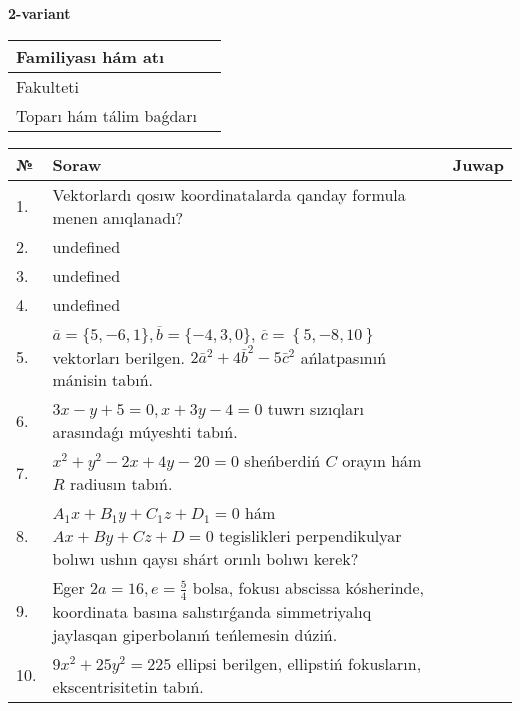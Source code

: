 \documentclass{article}
\begin{document}
\egroup

\newpage


\textbf{2-variant}\\

\bgroup
\def\arraystretch{1.6} %

\begin{tabular}{|m{5.7cm}|m{9.5cm}|}
\hline
Familiyası hám atı & \\
\hline
Fakulteti  & \\
\hline
Toparı hám tálim baǵdarı  & \\
\hline
\end{tabular}

\vspace{0.7cm}

\begin{tabular}{|m{0.7cm}|m{10cm}|m{4cm}|}
\hline
№ & Soraw & Juwap \\
\hline
1. & Vektorlardı qosıw koordinatalarda qanday formula menen anıqlanadı? &  \\
\hline
2. & undefined &  \\
\hline
3. & undefined &  \\
\hline
4. & undefined &  \\
\hline
5. & \(\overline{a} = \{5,- 6, 1 \}, \overline{b} = \{ - 4, 3, 0 \} \), \(\overline{c} = \left\{ 5,- 8, 10 \right\}\) vektorları berilgen. \(2{\bar{a}}^{2} + 4{\bar{b}}^{2} - 5{\bar{c}}^{2}\) ańlatpasınıń mánisin tabıń. &  \\
\hline
6. & \(3 x - y + 5 = 0, x + 3 y - 4 = 0\) tuwrı sızıqları arasındaǵı múyeshti tabıń. &  \\
\hline
7. & \(x^{2} + y^{2} - 2 x + 4 y - 20 = 0\) sheńberdiń \(C\) orayın hám \(R\) radiusın tabıń. &  \\
\hline
8. & \(A_{1}x + B_{1}y + C_{1}z + D_{1} = 0\) hám \(Ax + By + Cz + D = 0\) tegislikleri perpendikulyar bolıwı ushın qaysı shárt orınlı bolıwı kerek? &  \\
\hline
9. & Eger \(2 a = 16, e = \frac{5}{4}\) bolsa, fokusı abscissa kósherinde, koordinata basına salıstırǵanda simmetriyalıq jaylasqan giperbolanıń teńlemesin dúziń. &  \\
\hline
10. & \(9 x^{2} + 25 y^{2} = 225\) ellipsi berilgen, ellipstiń fokusların, ekscentrisitetin tabıń. & \\
\hline
\end{tabular}

\vspace{0.7cm}
\end{document}
